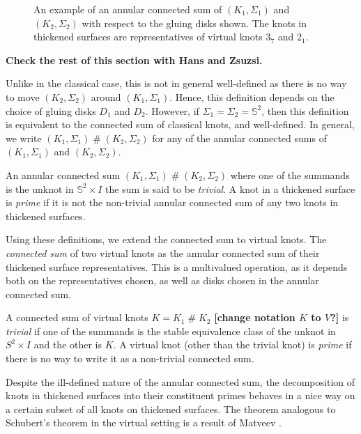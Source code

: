 \documentclass[12pt]{report}
\renewcommand{\S}{\mathbb{S}}
\newcommand{\hash}{\ensuremath{\mathbin{\#}}}
\newcommand{\notered}[1]{{\color{Red} \textbf{#1}}}
\begin{document}
\begin{figure}[hbt!]
	\centering
	\def\svgscale{0.6}
	
	
	\caption{An example of an annular connected sum of $(K_{1}, \Sigma_{1})$ and $(K_{2}, \Sigma_{2})$ with respect to the gluing disks shown. The knots in thickened surfaces are representatives of virtual knots $3_{7}$ and $2_{1}$.}
	\label{fig:annular-connected-sum}
\end{figure}

\notered{Check the rest of this section with Hans and Zsuzsi.} 

Unlike in the classical case, this is not in general well-defined \cite{virtual-knots-and-links} as there is no way to move $(K_{2}, \Sigma_{2})$ around $(K_{1}, \Sigma_{1})$. Hence, this definition depends on the choice of gluing disks $D_{1}$ and $D_{2}$. However, if $\Sigma_{1} = \Sigma_{2} = \S^{2}$, then this definition is equivalent to the connected sum of classical knots, and well-defined. In general, we write $(K_{1}, \Sigma_{1}) \hash (K_{2}, \Sigma_{2})$ for any of the annular connected sums of $(K_{1}, \Sigma_{1})$ and $(K_{2}, \Sigma_{2})$.

An annular connected sum $(K_{1}, \Sigma_{1}) \hash (K_{2}, \Sigma_{2})$ where one of the summands is the unknot in $\S^{2} \times I$ the sum is said to be \textit{trivial}. A knot in a thickened surface is \textit{prime} if it is not the non-trivial annular connected sum of any two knots in thickened surfaces.

Using these definitions, we extend the connected sum to virtual knots. The \textit{connected sum} of two virtual knots as the annular connected sum of their thickened surface representatives. This is a multivalued operation, as it depends both on the representatives chosen, as well as disks chosen in the annular connected sum.

A connected sum of virtual knots $K = K_{1} \hash K_{2}$ \notered{[change notation $K$ to $V$?]} is \textit{trivial} if one of the summands is the stable equivalence class of the unknot in $S^{2} \times I$ and the other is $K$. A virtual knot (other than the trivial knot) is \textit{prime} if there is no way to write it as a non-trivial connected sum.

Despite the ill-defined nature of the annular connected sum, the decomposition of knots in thickened surfaces into their constituent primes behaves in a nice way on a certain subset of all knots on thickened surfaces. The theorem analogous to Schubert's theorem in the virtual setting is a result of Matveev \cite[Theorem 13]{roots-and-decompositions}.
\end{document}
